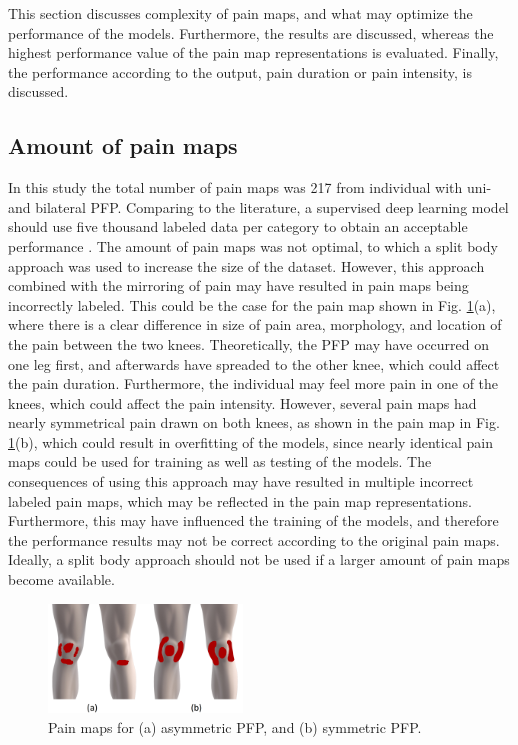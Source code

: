 This section discusses complexity of pain maps, and what may optimize the performance of the models. Furthermore, the results are discussed, whereas the highest performance value of the pain map representations is evaluated. Finally, the performance according to the output, pain duration or pain intensity, is discussed.

\subsection{Amount of pain maps}
In this study the total number of pain maps was 217 from individual with uni- and bilateral PFP. Comparing to the literature, a supervised deep learning model should use five thousand labeled data per category to obtain an acceptable performance \citep{Goodfellow2016}.
\noindent
The amount of pain maps was not optimal, to which a split body approach was used to increase the size of the dataset. However, this approach combined with the mirroring of pain may have resulted in pain maps being incorrectly labeled. This could be the case for the pain map shown in Fig. \ref{fig:bipainmap}(a), where there is a clear difference in size of pain area, morphology, and location of the pain between the two knees. Theoretically, the PFP may have occurred on one leg first, and afterwards have spreaded to the other knee, which could affect the pain duration. Furthermore, the individual may feel more pain in one of the knees, which could affect the pain intensity.
However, several pain maps had nearly symmetrical pain drawn on both knees, as shown in the pain map in Fig. \ref{fig:bipainmap}(b), which could result in overfitting of the models, since nearly identical pain maps could be used for training as well as testing of the models.\newline
\noindent
The consequences of using this approach may have resulted in multiple incorrect labeled pain maps, which may be reflected in the pain map representations. Furthermore, this may have influenced the training of the models, and therefore the performance results may not be correct according to the original pain maps. Ideally, a split body approach should not be used if a larger amount of pain maps become available.

\begin{figure}[H]
\centering
\includegraphics[width=0.46\textwidth]{Figures/Simmetry}
\caption{Pain maps for (a) asymmetric PFP, and (b) symmetric PFP.}
\label{fig:bipainmap}
\end{figure}


